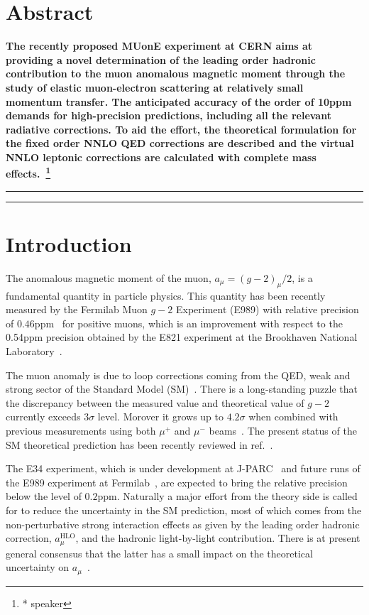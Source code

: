 \documentclass[Physsubmission, Phys]{SciPost}
\begin{document}
\section*{Abstract}
{\bf
The recently proposed MUonE experiment at CERN aims at providing a novel determination of the leading order hadronic contribution to the muon anomalous magnetic moment through the study of elastic muon-electron scattering at relatively small momentum transfer. The anticipated accuracy of the order of 10ppm demands for high-precision predictions, including all the relevant radiative corrections. To aid the effort, the theoretical formulation for the fixed order NNLO QED corrections are described and the virtual NNLO leptonic corrections are calculated with complete mass effects.~\footnote{* speaker}
}


\vspace{10pt}
\noindent\rule{\textwidth}{1pt}
\tableofcontents\thispagestyle{fancy}
\noindent\rule{\textwidth}{1pt}
\vspace{10pt}


\section{Introduction}
\label{sec:intro}
The anomalous magnetic moment of the muon, $a_\mu =
(g-2)_\mu / 2$, is a fundamental quantity in particle physics. This quantity has been recently measured by the Fermilab Muon $g-2$ Experiment
(E989) with relative precision of
$0.46$ppm~\cite{Abi:2021gix} for positive muons, which is an improvement with respect to the
0.54ppm precision obtained by the E821 experiment at the Brookhaven
National Laboratory~\cite{Bennett:2006fi}.

The muon anomaly is due to loop corrections
coming from the QED, weak and strong sector of the
Standard Model (SM)~\cite{Jegerlehner:2009ry,Jegerlehner:2017gek}. There is a long-standing puzzle that the discrepancy between the measured value and theoretical value of $g-2$ currently
exceeds $3\sigma$ level. Morover it
grows up to $4.2\sigma$ when combined with previous measurements using both $\mu^+$ and $\mu^-$
beams~\cite{Abi:2021gix}. The present status of the SM theoretical
prediction has been recently reviewed in
ref.~\cite{Aoyama:2020ynm}.

The E34
experiment, which is under development at
J-PARC~\cite{Iinuma:2011zz,Mibe:2011zz} and future runs of the E989 experiment at
Fermilab~\cite{Venanzoni:2014ixa,Grange:2015fou}, are expected to bring the
relative precision below
the level of $0.2$ppm.  Naturally a major effort from the theory
side is called for to reduce the uncertainty in the SM prediction, most of which
comes from the non-perturbative strong interaction effects as given by
the leading order hadronic correction, $a_\mu^\text{HLO}$, and the
hadronic light-by-light contribution. There is at present
general consensus that the latter has a small impact on the
theoretical uncertainty on $a_\mu$~\cite{Aoyama:2020ynm}.
\end{document}
